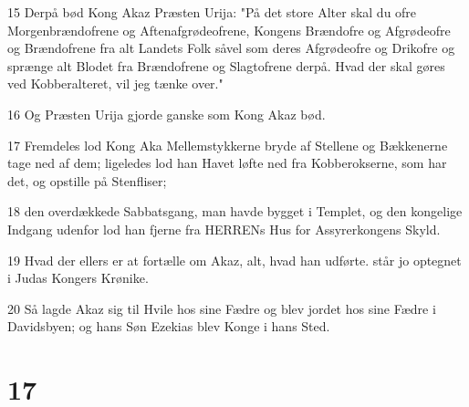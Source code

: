 \par 15 Derpå bød Kong Akaz Præsten Urija: "På det store Alter skal du ofre Morgenbrændofrene og Aftenafgrødeofrene, Kongens Brændofre og Afgrødeofre og Brændofrene fra alt Landets Folk såvel som deres Afgrødeofre og Drikofre og sprænge alt Blodet fra Brændofrene og Slagtofrene derpå. Hvad der skal gøres ved Kobberalteret, vil jeg tænke over."
\par 16 Og Præsten Urija gjorde ganske som Kong Akaz bød.
\par 17 Fremdeles lod Kong Aka Mellemstykkerne bryde af Stellene og Bækkenerne tage ned af dem; ligeledes lod han Havet løfte ned fra Kobberokserne, som har det, og opstille på Stenfliser;
\par 18 den overdækkede Sabbatsgang, man havde bygget i Templet, og den kongelige Indgang udenfor lod han fjerne fra HERRENs Hus for Assyrerkongens Skyld.
\par 19 Hvad der ellers er at fortælle om Akaz, alt, hvad han udførte. står jo optegnet i Judas Kongers Krønike.
\par 20 Så lagde Akaz sig til Hvile hos sine Fædre og blev jordet hos sine Fædre i Davidsbyen; og hans Søn Ezekias blev Konge i hans Sted.

\chapter{17}

